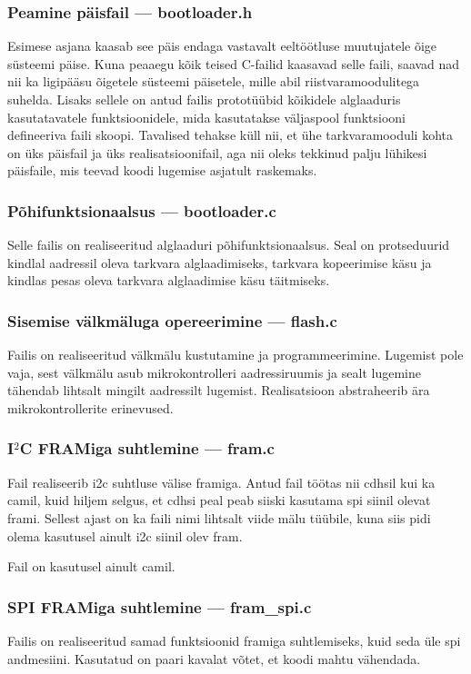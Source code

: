 \documentclass[12pt,a4paper]{article}
\newcommand{\iic}{I${}^2$C}
\begin{document}
\subsubsection{Peamine päisfail --- \textbf{bootloader.h}}
Esimese asjana kaasab see päis endaga vastavalt eeltöötluse muutujatele õige
süsteemi päise. Kuna peaaegu kõik teised C-failid kaasavad selle faili, saavad
nad nii ka ligipääsu õigetele süsteemi päisetele, mille abil
riistvaramoodulitega suhelda. Lisaks sellele on antud failis prototüübid
kõikidele alglaaduris kasutatavatele funktsioonidele, mida kasutatakse
väljaspool funktsiooni defineeriva faili skoopi. Tavalised tehakse küll nii, et
ühe tarkvaramooduli kohta on üks päisfail ja üks realisatsioonifail, aga nii
oleks tekkinud palju lühikesi päisfaile, mis teevad koodi lugemise asjatult
raskemaks.

\subsubsection{Põhifunktsionaalsus --- \textbf{bootloader.c}}
Selle failis on realiseeritud alglaaduri põhifunktsionaalsus. Seal on
protseduurid kindlal aadressil oleva tarkvara alglaadimiseks, tarkvara
kopeerimise käsu ja kindlas pesas oleva tarkvara alglaadimise käsu täitmiseks.

\subsubsection{Sisemise välkmäluga opereerimine --- \textbf{flash.c}}
Failis on realiseeritud välkmälu kustutamine ja programmeerimine.
Lugemist pole vaja, sest välkmälu asub mikrokontrolleri aadressiruumis ja sealt
lugemine tähendab lihtsalt mingilt aadressilt lugemist. Realisatsioon
abstraheerib ära mikrokontrollerite erinevused.

\subsubsection{\texorpdfstring{\iic}{I2C} FRAMiga suhtlemine --- \textbf{fram.c}}
Fail realiseerib \gls{i2c} suhtluse välise \gls{fram}iga. Antud fail töötas nii
\gls{cdhs}il kui ka \gls{cam}il, kuid hiljem selgus, et \gls{cdhs}i peal peab
siiski kasutama \gls{spi} siinil olevat \gls{fram}i. Sellest ajast on ka faili
nimi lihtsalt viide mälu tüübile, kuna siis pidi olema kasutusel ainult
\gls{i2c} siinil olev \gls{fram}.

Fail on kasutusel ainult \gls{cam}il.

\subsubsection{SPI FRAMiga suhtlemine --- \textbf{fram\_spi.c}}
Failis on realiseeritud samad funktsioonid \gls{fram}iga suhtlemiseks, kuid seda
üle \gls{spi} andmesiini. Kasutatud on paari kavalat võtet, et koodi mahtu
vähendada.
\end{document}
